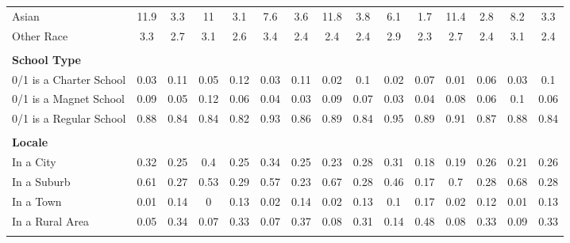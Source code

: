 \begin{tabular*}{0.95\textwidth}{@{\extracolsep{\fill} } lcccccccccccccc}
\hspace{0.2cm}Asian&11.9&3.3&11&3.1&7.6&3.6&11.8&3.8&6.1&1.7&11.4&2.8&8.2&3.3\\%
\hspace{0.2cm}Other Race&3.3&2.7&3.1&2.6&3.4&2.4&2.4&2.4&2.9&2.3&2.7&2.4&3.1&2.4\\%
&&&&&&&&&&&&&&\\%
\multicolumn{15}{l}{\bfseries School Type}\\%
\hspace{0.2cm}0/1 is a Charter School&0.03&0.11&0.05&0.12&0.03&0.11&0.02&0.1&0.02&0.07&0.01&0.06&0.03&0.1\\%
\hspace{0.2cm}0/1 is a Magnet School&0.09&0.05&0.12&0.06&0.04&0.03&0.09&0.07&0.03&0.04&0.08&0.06&0.1&0.06\\%
\hspace{0.2cm}0/1 is a Regular School&0.88&0.84&0.84&0.82&0.93&0.86&0.89&0.84&0.95&0.89&0.91&0.87&0.88&0.84\\%
&&&&&&&&&&&&&&\\%
\multicolumn{15}{l}{\bfseries Locale}\\%
\hspace{0.2cm}In a City&0.32&0.25&0.4&0.25&0.34&0.25&0.23&0.28&0.31&0.18&0.19&0.26&0.21&0.26\\%
\hspace{0.2cm}In a Suburb&0.61&0.27&0.53&0.29&0.57&0.23&0.67&0.28&0.46&0.17&0.7&0.28&0.68&0.28\\%
\hspace{0.2cm}In a Town&0.01&0.14&0&0.13&0.02&0.14&0.02&0.13&0.1&0.17&0.02&0.12&0.01&0.13\\%
\hspace{0.2cm}In a Rural Area&0.05&0.34&0.07&0.33&0.07&0.37&0.08&0.31&0.14&0.48&0.08&0.33&0.09&0.33\\%
&&&&&&&&&&&&&&\\%
\hline%
\end{tabular*}